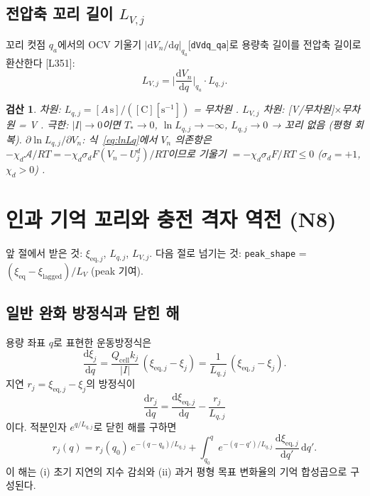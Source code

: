 \documentclass[11pt,a4paper]{article}
\newtheorem*{verifybox}{검산}
\newcommand{\dd}{\mathrm{d}}
\newcommand{\eq}{\mathrm{eq}}
\newcommand{\cell}{\mathrm{cell}}
\begin{document}
\subsection{전압축 꼬리 길이 $L_{V,j}$}

꼬리 컷점 $q_a$에서의 OCV 기울기 $|\dd V_n/\dd q|_{q_a}$[\texttt{dVdq\_qa}]로
용량축 길이를 전압축 길이로 환산한다 [L351]:
\begin{equation}
  L_{V,j} = \Big|\frac{\dd V_n}{\dd q}\Big|_{q_a} \cdot L_{q,j}.
  \label{eq:LV}
\end{equation}

\begin{verifybox}
차원: $L_{q,j} = [A\,\mathrm{s}]/([\mathrm{C}][\mathrm{s}^{-1}])$ = 무차원 \checkmark.
$L_{V,j}$ 차원: [V/무차원]$\times$무차원 = V \checkmark.
극한: $|I|\to0$이면 $T_*\to0$, $\ln L_{q,j}\to-\infty$,
$L_{q,j}\to0$ → 꼬리 없음 (평형 회복).
$\partial\ln L_{q,j}/\partial V_n$: 식~\eqref{eq:lnLq}에서 $V_n$ 의존항은
$-\chi_d\mathcal{A}/RT = -\chi_d\sigma_d F(V_n-U_j^d)/RT$이므로
기울기 $= -\chi_d\sigma_d F/RT \le 0$ ($\sigma_d=+1$, $\chi_d>0$) \checkmark.
\end{verifybox}

\section{인과 기억 꼬리와 충전 격자 역전 (N8)}
\label{sec:tail}
앞 절에서 받은 것: $\xi_{\eq,j}$, $L_{q,j}$, $L_{V,j}$.
다음 절로 넘기는 것: \texttt{peak\_shape} = $(ξ_{\eq}-ξ_{\mathrm{lagged}})/L_V$ (peak 기여).

\subsection{일반 완화 방정식과 닫힌 해}

용량 좌표 $q$로 표현한 운동방정식은
\begin{equation}
  \frac{\dd\xi_j}{\dd q} = \frac{Q_\cell k_j}{|I|}\,(\xi_{\eq,j}-\xi_j)
  = \frac{1}{L_{q,j}}\,(\xi_{\eq,j}-\xi_j).
  \label{eq:relaxq}
\end{equation}
지연 $r_j = \xi_{\eq,j}-\xi_j$의 방정식이
\begin{equation}
  \frac{\dd r_j}{\dd q} = \frac{\dd\xi_{\eq,j}}{\dd q} - \frac{r_j}{L_{q,j}}
  \label{eq:Lq_eq}
\end{equation}
이다. 적분인자 $e^{q/L_{q,j}}$로 닫힌 해를 구하면
\begin{equation}
  r_j(q) = r_j(q_0)\,e^{-(q-q_0)/L_{q,j}}
  + \int_{q_0}^q e^{-(q-q')/L_{q,j}}\,\frac{\dd\xi_{\eq,j}}{\dd q'}\,\dd q'.
  \label{eq:memory}
\end{equation}
이 해는 (i) 초기 지연의 지수 감쇠와 (ii) 과거 평형 목표 변화율의 기억 합성곱으로 구성된다.
\end{document}
